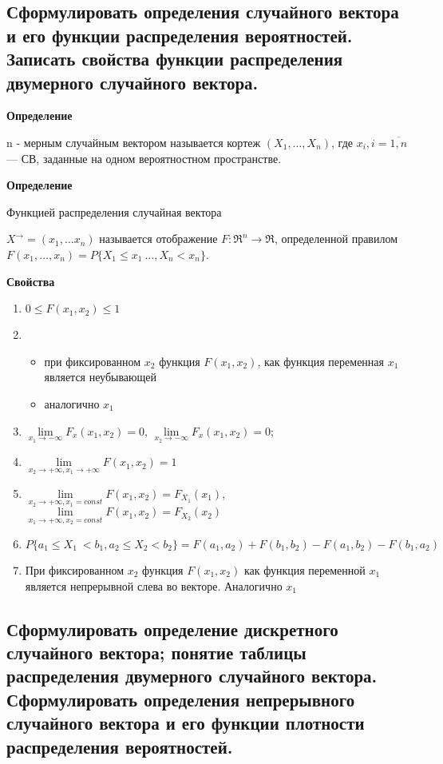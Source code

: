 \subsection{Сформулировать определения случайного вектора и его функции распределения вероятностей. Записать свойства функции распределения двумерного случайного вектора.}

\textbf{Определение}

n - мерным случайным вектором называется кортеж $(X_1, \dots, X_n)$, где $x_i, i=\overline{1,n}$ --- СВ, заданные на одном вероятностном пространстве.

\textbf{Определение}

Функцией распределения случайная вектора

$X^\rightarrow = (x_1, \dots x_n)$ называется отображение $F: \Re^n \rightarrow \Re$, определенной правилом $F(x_1, \dots, x_n) = P\{X_1 \leq x_1\ \dots, X_n < x_n\}$.

\textbf{Свойства}

\begin{enumerate}[label=\arabic*.]
	\item $0 \leq F(x_1, x_2) \leq 1$
	\item \begin{itemize}
		\item при фиксированном $x_2$ функция $F(x_1, x_2)$, как функция переменная $x_1$ является неубывающей
		\item аналогично $x_1$
	\end{itemize}
	\item $\lim\limits_{x_1 \rightarrow -\infty}F_x(x_1, x_2) = 0$, $\lim\limits_{x_2 \rightarrow -\infty}F_x(x_1, x_2) = 0$;
	\item $\lim\limits_{x_2 \rightarrow +\infty, x_1 \rightarrow +\infty}F(x_1, x_2) = 1$
	\item $\lim\limits_{x_2 \rightarrow +\infty, x_1 = const}F(x_1, x_2) = F_{X_1}(x_1)$, $\lim\limits_{x_1 \rightarrow +\infty, x_2 = const}F(x_1, x_2) = F_{X_2}(x_2)$
	\item $P\{a_1 \leq X_1\ < b_1, a_2 \leq X_2 < b_2\} = F(a_1, a_2) + F(b_1, b_2) - F(a_1, b_2) - F(b_1, a_2)$
	\item При фиксированном $x_2$ функция $F(x_1, x_2)$ как функция переменной $x_1$ является непрерывной слева во векторе. Аналогично $x_1$
\end{enumerate}

\subsection{Сформулировать определение дискретного случайного вектора; понятие таблицы распределения двумерного случайного вектора. Сформулировать определения непрерывного случайного вектора и его функции плотности распределения вероятностей.}

